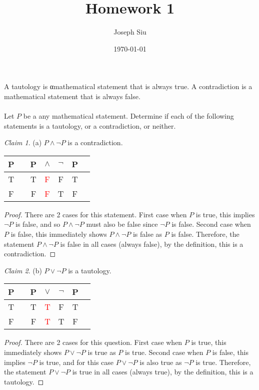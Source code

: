 \documentclass{homework}
\author{Joseph Siu}
\date{\today}
\title{Homework 1}
\begin{document}
 \maketitle
\theoremstyle{remark}
\newtheorem*{claim}{Claim}


\question A tautology is αmathematical statement that is always true. A contradiction is a mathematical statement that is always false.\\\\Let $P$ be a any mathematical statement. Determine if each of the following statements is a tautology, or a contradiction, or neither.\\

\begin{claim}
(a)   $P\wedge\neg P$ is a contradiction.
\end{claim}

\begin{center}
    \begin{tabular}{@{ }c | c@{ }@{ }c@{ }@{ }c@{ }@{ }c@{ }@{ }c@{ }@{ }c}
P &  & P & $\land$ & $\lnot$ & P & \\
\hline 
T &  & T & \textcolor{red}{F} & F & T & \\
F &  & F & \textcolor{red}{F} & T & F & \\
\end{tabular}
\end{center}
\begin{proof}
    There are 2 cases for this statement. First case when $P$ is true, this implies $\neg P$ is false, and so $P\land\neg P$ must also be false since $\neg P$ is false. Second case when $P$ is false, this immediately shows $P\land\neg P$ is false as $P$ is false. Therefore, the statement $P\land\neg P$ is false in all cases (always false), by the definition, this is a contradiction.
\end{proof}


\begin{claim}
(b) $P\lor\lnot P$ is a tautology.
\end{claim}

\begin{center}
\begin{tabular}{@{ }c | c@{ }@{ }c@{ }@{ }c@{ }@{ }c@{ }@{ }c@{ }@{ }c}
P &  & P & $\lor$ & $\lnot$ & P & \\
\hline 
T &  & T & \textcolor{red}{T} & F & T & \\
F &  & F & \textcolor{red}{T} & T & F & \\
\end{tabular}
\end{center}
\begin{proof}
    There are 2 cases for this question. First case when $P$ is true, this immediately shows $P\lor\neg P$ is true as $P$ is true. Second case when $P$ is false, this implies $\neg P$ is true, and for this case $P\lor\neg P$ is also true as $\neg P$ is true. Therefore, the statement $P\lor\neg P$ is true in all cases (always true), by the definition, this is a tautology. 
\end{proof}
\end{document}
